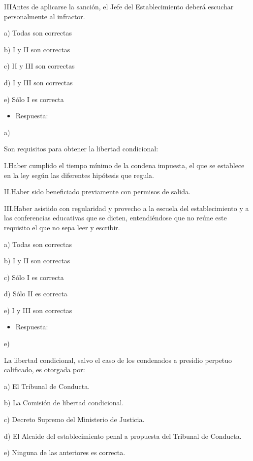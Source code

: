 \documentclass[letterpaper, 11pt]{article}
\begin{document}
IIIAntes de aplicarse la sanción, el Jefe del Establecimiento deberá
escuchar personalmente al infractor.


a) Todas son correctas

b) I y II son correctas

c) II y III son correctas

d) I y III son correctas

e) Sólo I es correcta



\begin{itemize}
\item Respuesta:
\end{itemize}

a)


Son requisitos para obtener la libertad condicional:


I.Haber cumplido el tiempo mínimo de la condena impuesta, el que se
establece en la ley según las diferentes hipótesis que regula.



II.Haber sido beneficiado previamente con permisos de salida.


III.Haber asistido con regularidad y provecho a la escuela del
establecimiento y a las conferencias educativas que se dicten,
entendiéndose que no reúne este requisito el que no sepa leer y
escribir.



a) Todas son correctas

b) I y II son correctas

c) Sólo I es correcta

d) Sólo II es correcta

e) I y III son correctas


\begin{itemize}
\item Respuesta:
\end{itemize}

e)



La libertad condicional, salvo el caso de los condenados a presidio
perpetuo calificado, es otorgada por:


a) El Tribunal de Conducta.


b) La Comisión de libertad condicional.


c) Decreto Supremo del Ministerio de Justicia.


d) El Alcaide del establecimiento penal a propuesta del Tribunal de
Conducta.


e) Ninguna de las anteriores es correcta.
\end{document}
